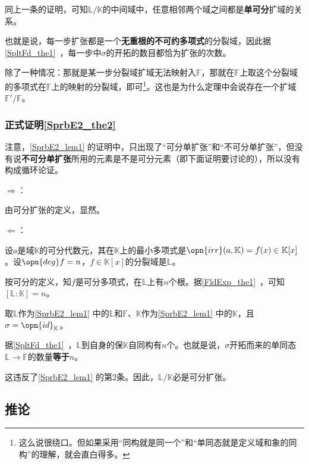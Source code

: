 同上一条的证明，可知$\mathbb{L}/\mathbb{K}$的中间域中，任意相邻两个域之间都是\textbf{单可分}扩域的关系。

也就是说，每一步扩张都是一个\textbf{无重根的不可约多项式}的分裂域，因此据\autoref{SpltFd_the1}~，每一步中$\sigma$的开拓的数目都恰为扩张的次数。

除了一种情况：那就是某一步分裂域扩域无法映射入$\mathbb{F}$，那就在$\mathbb{F}$上取这个分裂域的多项式在$\mathbb{F}$上的映射的分裂域，即可\footnote{这么说很绕口。但如果采用“同构就是同一个”和“单同态就是定义域和象的同构”的理解，就会直白得多。}。这也是为什么定理中会说存在一个扩域$\mathbb{F}'/\mathbb{F}$。




\subsubsection{正式证明\autoref{SprbE2_the2} }

注意，\autoref{SprbE2_lem1} 的证明中，只出现了“可分单扩张”和“不可分单扩张”，但没有说\textbf{不可分单扩张}所用的元素是不是可分元素（即下面证明要讨论的），所以没有构成循环论证。

$\Rightarrow$：

由可分扩张的定义，显然。

$\Leftarrow$：

设$a$是域$\mathbb{K}$的可分代数元，其在$\mathbb{K}$上的最小多项式是$\opn{irr}(a, \mathbb{K})=f(x)\in\mathbb{K}[x]$。设$\opn{deg}f=n$，$f\in\mathbb{K}[x]$的分裂域是$\mathbb{L}$。

按可分的定义，知$f$是可分多项式，在$\mathbb{L}$上有$n$个根。据\autoref{FldExp_the1}~，可知$[\mathbb{L}:\mathbb{K}]=n$。

取$\mathbb{L}$作为\autoref{SprbE2_lem1} 中的$\mathbb{L}$和$\mathbb{F}$、$\mathbb{K}$作为\autoref{SprbE2_lem1} 中的$\mathbb{K}$，且$\sigma=\opn{id}_{\mathbb{K}}$。

据\autoref{SpltFd_the1}~，$\mathbb{L}$到自身的保$\mathbb{K}$自同构有$n$个。也就是说，$\sigma$开拓而来的单同态$\mathbb{L}\to\mathbb{F}$的数量\textbf{等于}$n$。

这违反了\autoref{SprbE2_lem1} 的第$2$条。因此，$\mathbb{L}/\mathbb{K}$必是可分扩张。



\subsection{推论}



